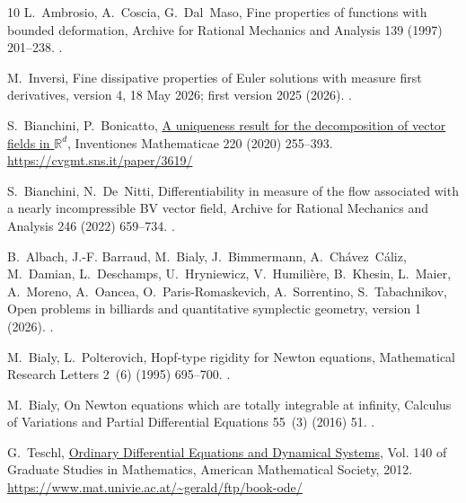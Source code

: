 \documentclass[review,12pt,times,a4paper,nopreprintline]{elsarticle}
\theoremstyle{plain}
\theoremstyle{definition}
\theoremstyle{remark}
\numberwithin{equation}{section}
\begin{document}
\begin{thebibliography}{10}
L.~Ambrosio, A.~Coscia, G.~Dal~Maso, Fine properties of functions with bounded
  deformation, Archive for Rational Mechanics and Analysis 139 (1997) 201--238.
\newblock \href {https://doi.org/10.1007/s002050050051}
  {}.

M.~Inversi, Fine dissipative properties of {Euler} solutions with measure first
  derivatives, version 4, 18 May 2026; first version 2025 (2026).
\newblock \href {https://arxiv.org/abs/2510.10704v4}
  {}.

S.~Bianchini, P.~Bonicatto, \href{https://cvgmt.sns.it/paper/3619/}{A
  uniqueness result for the decomposition of vector fields in {$\mathbb R^d$}},
  Inventiones Mathematicae 220 (2020) 255--393.
\newline\urlprefix\url{https://cvgmt.sns.it/paper/3619/}

S.~Bianchini, N.~De~Nitti, Differentiability in measure of the flow associated
  with a nearly incompressible {BV} vector field, Archive for Rational
  Mechanics and Analysis 246 (2022) 659--734.
\newblock \href {https://doi.org/10.1007/s00205-022-01820-1}
  {}.

B.~Albach, J.-F. Barraud, M.~Bialy, J.~Bimmermann, A.~Ch{\'a}vez~C{\'a}liz,
  M.~Damian, L.~Deschamps, U.~Hryniewicz, V.~Humili{\`e}re, B.~Khesin,
  L.~Maier, A.~Moreno, A.~Oancea, O.~Paris-Romaskevich, A.~Sorrentino,
  S.~Tabachnikov, Open problems in billiards and quantitative symplectic
  geometry, version 1 (2026).
\newblock \href {https://arxiv.org/abs/2602.12896v1}
  {}.

M.~Bialy, L.~Polterovich, Hopf-type rigidity for {Newton} equations,
  Mathematical Research Letters 2~(6) (1995) 695--700.
\newblock \href {https://doi.org/10.4310/MRL.1995.v2.n6.a3}
  {}.

M.~Bialy, On {Newton} equations which are totally integrable at infinity,
  Calculus of Variations and Partial Differential Equations 55~(3) (2016) 51.
\newblock \href {https://doi.org/10.1007/s00526-016-0985-8}
  {}.

G.~Teschl, \href{https://www.mat.univie.ac.at/~gerald/ftp/book-ode/}{Ordinary
  Differential Equations and Dynamical Systems}, Vol. 140 of Graduate Studies
  in Mathematics, American Mathematical Society, 2012.
\newline\urlprefix\url{https://www.mat.univie.ac.at/~gerald/ftp/book-ode/}


\end{thebibliography}
\end{document}

